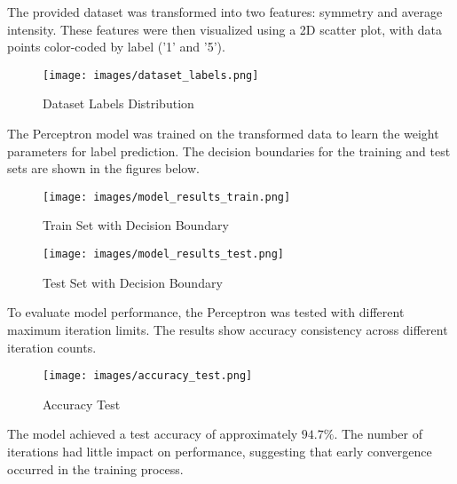 \documentclass[11pt]{article}
\begin{document}
The provided dataset was transformed into two features: symmetry and average intensity. These features were then visualized using a 2D scatter plot, with data points color-coded by label ('1' and '5').

\begin{figure}[H]
    \centering
    \texttt{[image: images/dataset\_labels.png]}
    \caption{Dataset Labels Distribution}
    \label{fig:enter-label}
\end{figure}

The Perceptron model was trained on the transformed data to learn the weight parameters for label prediction. The decision boundaries for the training and test sets are shown in the figures below.

\begin{figure}[H]
    \centering
    \texttt{[image: images/model\_results\_train.png]}
    \caption{Train Set with Decision Boundary}
    \label{fig:enter-label}
\end{figure}
\begin{figure}[H]
    \centering
    \texttt{[image: images/model\_results\_test.png]}
    \caption{Test Set with Decision Boundary}
    \label{fig:enter-label}
\end{figure}

To evaluate model performance, the Perceptron was tested with different maximum iteration limits. The results show accuracy consistency across different iteration counts.

\begin{figure}[H]
    \centering
    \texttt{[image: images/accuracy\_test.png]}
    \caption{Accuracy Test}
    \label{fig:enter-label}
\end{figure}

The model achieved a test accuracy of approximately $94.7\%$. The number of iterations had little impact on performance, suggesting that early convergence occurred in the training process.
\end{document}
